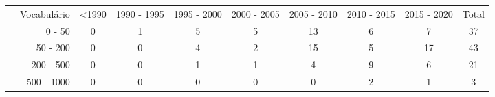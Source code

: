 \begin{table}[ht!]
{\begin{tabular}{lrcccccccc}
                                                                         & \multicolumn{1}{r|}{\cellcolor[HTML]{EFEFEF}Vocabulário}                   & \cellcolor[HTML]{EFEFEF}\textless 1990           & \cellcolor[HTML]{EFEFEF}1990 - 1995 & \cellcolor[HTML]{EFEFEF}1995 - 2000 & \cellcolor[HTML]{EFEFEF}2000 - 2005 & \cellcolor[HTML]{EFEFEF}2005 - 2010 & \cellcolor[HTML]{EFEFEF}2010 - 2015 & \multicolumn{1}{c|}{\cellcolor[HTML]{EFEFEF}2015 - 2020} & \cellcolor[HTML]{EFEFEF}Total                   \\ \cline{2-10}
                                                                         & \multicolumn{1}{r|}{0 - 50}                                                & 0                                                & \cellcolor[HTML]{FFFDFA}1           & \cellcolor[HTML]{FFF7E6}5           & \cellcolor[HTML]{FFF7E6}5           & \cellcolor[HTML]{FFEABF}13          & \cellcolor[HTML]{FFF5E1}6           & \multicolumn{1}{c|}{\cellcolor[HTML]{FFF3DC}7}           & 37                                              \\
                                                                         & \multicolumn{1}{r|}{50 - 200}                                              & 0                                                & 0                                   & \cellcolor[HTML]{FFF8EB}4           & \cellcolor[HTML]{FFFCF5}2           & \cellcolor[HTML]{FFE6B5}15          & \cellcolor[HTML]{FFF7E6}5           & \multicolumn{1}{c|}{\cellcolor[HTML]{FFE3AB}17}          & 43                                              \\
                                                                         & \multicolumn{1}{r|}{200 - 500}                                             & 0                                                & 0                                   & \cellcolor[HTML]{FFFDFA}1           & \cellcolor[HTML]{FFFDFA}1           & \cellcolor[HTML]{FFF8EB}4           & \cellcolor[HTML]{FFF0D3}9           & \multicolumn{1}{c|}{\cellcolor[HTML]{FFF5E1}6}           & 21                                              \\
                                                                         & \multicolumn{1}{r|}{500 - 1000}                                            & 0                                                & 0                                   & 0                                   & 0                                   & 0                                   & \cellcolor[HTML]{FFFCF5}2           & \multicolumn{1}{c|}{\cellcolor[HTML]{FFFDFA}1}           & 3                                               \\

\end{tabular}}
\end{table}
